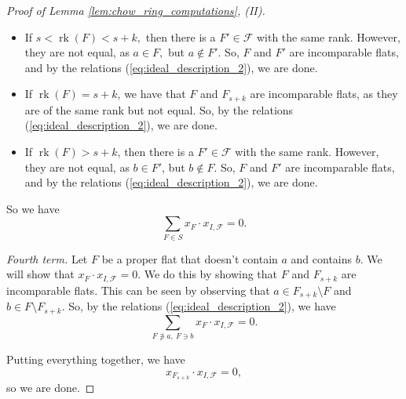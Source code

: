 \documentclass{amsart}
\theoremstyle{plain}
\theoremstyle{definition}
\newcommand{\rk}{\operatorname{rk}}
\begin{document}
\begin{proof}[Proof of Lemma \ref{lem:chow_ring_computations}, (II)]
\begin{itemize}
\item If $s < \rk(F) < s+k,$ then there is a $F' \in \mathscr{F}$ with the same rank. However, they are not equal, as $a\in F,$ but $a \notin F'.$ So, $F$ and $F'$ are incomparable flats, and by the relations (\ref{eq:ideal_description_2}), we are done.

\item If $\rk(F) = s+k$, we have that $F$ and $F_{s+k}$ are incomparable flats, as they are of the same rank but not equal. So, by the relations (\ref{eq:ideal_description_2}), we are done.

\item If $\rk(F) > s+k$, then there is a $F' \in \mathscr{F}$ with the same rank. However, they are not equal, as $b\in F'$, but $b \notin F$. So, $F$ and $F'$ are incomparable flats, and by the relations (\ref{eq:ideal_description_2}), we are done.
\end{itemize}
So we have
\begin{equation*}
\sum_{F \in S}x_F \cdot x_{I,\mathscr{F}} = 0.
\end{equation*}

\noindent
\textit{Fourth term.} Let $F$ be a proper flat that doesn't contain $a$ and contains $b$. We will show that $x_F \cdot x_{I, \mathscr{F}} = 0$. We do this by showing that $F$ and $F_{s+k}$ are incomparable flats. This can be seen by observing that $a \in F_{s+k} \setminus F$ and $b \in F \setminus F_{s+k}$. So, by the relations (\ref{eq:ideal_description_2}), we have
\begin{equation*}
\sum_{F \not\ni a,\: F \ni b}x_F \cdot x_{I,\mathscr{F}} = 0.
\end{equation*}

Putting everything together, we have
\begin{equation*}
x_{F_{s+k}} \cdot x_{I ,\mathscr{F}} = 0,
\end{equation*}
so we are done.
\end{proof}
\end{document}
